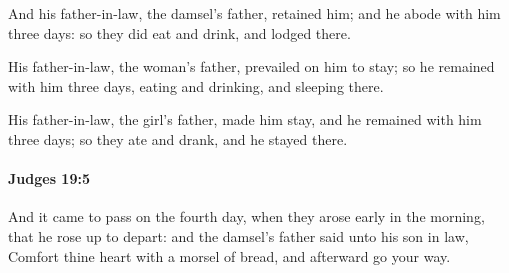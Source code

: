 			\begin{versebox}
					\item[BHS] 
					\item[ASV] And his father-in-law, the damsel's father, retained him; and he abode with him three days: so they did eat and drink, and lodged there.
					\item[NIV] His father-in-law, the woman’s father, prevailed on him to stay; so he remained with him three days, eating and drinking, and sleeping there.
					\item[NRSV] His father-in-law, the girl’s father, made him stay, and he remained with him three days; so they ate and drank, and he stayed there.
			\end{versebox}

		\paragraph{Judges 19:5} %
			\label{JUDGES-19-5}

			And it came to pass on the fourth day, when they arose early in the morning, that he rose up to depart: and the damsel’s father said unto his son in law, Comfort thine heart with a morsel of bread, and afterward go your way.

